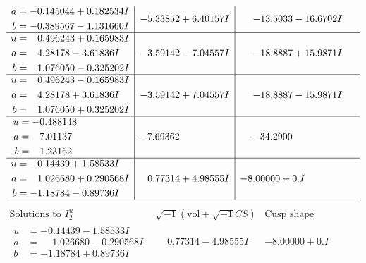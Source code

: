 \documentclass[1p]{elsarticle_modified}
\theoremstyle{definition}
\newcommand{\I}{\sqrt{-1}}
\begin{document}
$$\begin{array}{c|c|c}
\begin{aligned}
a &= -0.145044 + 0.182534 I \\
b &= -0.389567 - 1.131660 I\end{aligned}
 & -5.33852 + 6.40157 I & -13.5033 - 16.6702 I \\ \hline\begin{aligned}
u &= \phantom{-}0.496243 + 0.165983 I \\
a &= \phantom{-}4.28178 - 3.61836 I \\
b &= \phantom{-}1.076050 - 0.325202 I\end{aligned}
 & -3.59142 - 7.04557 I & -18.8887 + 15.9871 I \\ \hline\begin{aligned}
u &= \phantom{-}0.496243 - 0.165983 I \\
a &= \phantom{-}4.28178 + 3.61836 I \\
b &= \phantom{-}1.076050 + 0.325202 I\end{aligned}
 & -3.59142 + 7.04557 I & -18.8887 - 15.9871 I \\ \hline\begin{aligned}
u &= -0.488148\phantom{ +0.000000I} \\
a &= \phantom{-}7.01137\phantom{ +0.000000I} \\
b &= \phantom{-}1.23162\phantom{ +0.000000I}\end{aligned}
 & -7.69362\phantom{ +0.000000I} & -34.2900\phantom{ +0.000000I} \\ \hline\begin{aligned}
u &= -0.14439 + 1.58533 I \\
a &= \phantom{-}1.026680 + 0.290568 I \\
b &= -1.18784 - 0.89736 I\end{aligned}
 & \phantom{-}0.77314 + 4.98555 I & -8.00000 + 0. I\phantom{ +0.000000I}\\
 \hline 
 \end{array}$$\newpage$$\begin{array}{c|c|c}  
\text{Solutions to }I^u_{2}& \I (\text{vol} + \sqrt{-1}CS) & \text{Cusp shape}\\
 \hline 
\begin{aligned}
u &= -0.14439 - 1.58533 I \\
a &= \phantom{-}1.026680 - 0.290568 I \\
b &= -1.18784 + 0.89736 I\end{aligned}
 & \phantom{-}0.77314 - 4.98555 I & -8.00000 + 0. I\phantom{ +0.000000I} \\ \hline\begin{aligned}

\end{aligned}
\end{array}$$
\end{document}
